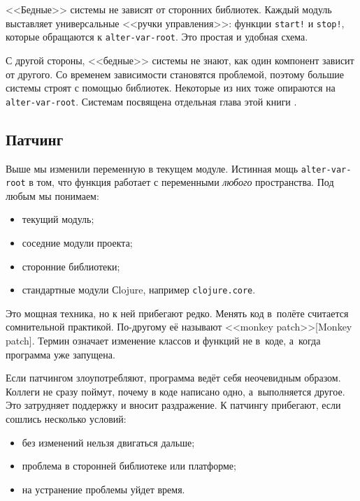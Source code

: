 
<<Бедные>> системы не зависят от сторонних библиотек. Каждый модуль выставляет
универсальные <<ручки управления>>: функции \verb|start!| и \verb|stop!|,
которые обращаются к \verb|alter-var-root|. Это простая и удобная схема.

С другой стороны, <<бедные>> системы не знают, как один компонент зависит от
другого. Со временем зависимости становятся проблемой, поэтому большие системы
строят с помощью библиотек. Некоторые из них тоже опираются на
\verb|alter-var-root|. Системам посвящена отдельная глава этой
книги .

\subsection{Патчинг}


Выше мы изменили переменную в текущем модуле. Истинная мощь
\verb|alter-var-root| в том, что функция работает с переменными \emph{любого}
пространства. Под любым мы понимаем:

\begin{itemize}

\item
  текущий модуль;

\item
  соседние модули проекта;

\item
  сторонние библиотеки;

\item
  стандартные модули Сlojure, например \verb|clojure.core|.

\end{itemize}


Это мощная техника, но к ней прибегают редко. Менять код в~полёте считается
сомнительной практикой. По-другому её называют <<monkey
patch>>[Monkey patch]. Термин означает
изменение классов и функций не в~коде, а~когда программа уже запущена.

Если патчингом злоупотребляют, программа ведёт себя неочевидным
образом. Коллеги не сразу поймут, почему в коде написано одно, а~выполняется
другое. Это затрудняет поддержку и вносит раздражение. К патчингу прибегают,
если сошлись несколько условий:

\begin{itemize}

\item
  без изменений нельзя двигаться дальше;

\item
  проблема в сторонней библиотеке или платформе;

\item
  на устранение проблемы уйдет время.

\end{itemize}

